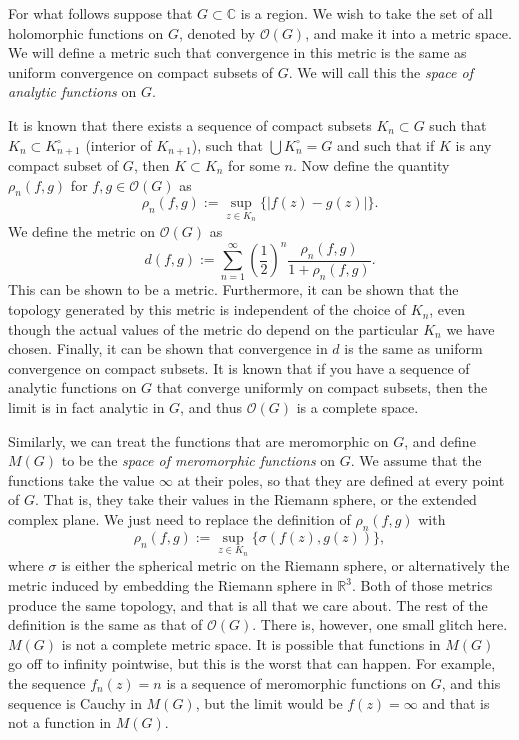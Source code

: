 \documentclass[12pt]{article}
\theoremstyle{theorem}
\theoremstyle{definition}
\theoremstyle{remark}
\begin{document}
For what follows suppose that $G \subset {\mathbb{C}}$ is a region.  We wish to take the set of all holomorphic functions on $G$, denoted by ${\mathcal{O}}(G)$, and make it into a metric space.  We will define a metric such that convergence in this metric is the same as uniform convergence on compact subsets of $G$.  We will call this the {\em space of analytic functions} on $G$.

It is known that there
exists a sequence of compact subsets $K_n \subset G$ such that $K_n \subset
K_{n+1}^\circ$ (interior of $K_{n+1}$), such that $\bigcup K_n^\circ = G$ and
such that if $K$ is any compact subset of $G$, then $K \subset K_n$ for some $n$.
Now define the quantity $\rho_n(f,g)$ for $f,g \in {\mathcal{O}}(G)$ as
\begin{equation*}
\rho_n(f,g) := \sup_{z \in K_n} \{ \lvert f(z) - g(z) \rvert \} .
\end{equation*}
We define the metric on ${\mathcal{O}}(G)$ as
\begin{equation*}
d(f,g) := \sum_{n=1}^\infty \left(\frac{1}{2}\right)^n
\frac{\rho_n(f,g)}{1+\rho_n(f,g)} .
\end{equation*}
This can be shown to be a metric.  Furthermore, it can be shown that the topology generated by this metric is independent of the choice of $K_n$, even though
the actual values of the metric do depend on the particular $K_n$ we have chosen.
Finally, it can be shown that convergence in $d$ is the same as uniform convergence on compact subsets.  It is known that if you have a sequence of
analytic functions on $G$ that converge uniformly on compact subsets, then the limit is in fact analytic in $G$, and thus ${\mathcal{O}}(G)$ is a complete space. 

Similarly, we can treat the functions that are meromorphic on $G$, and define
$M(G)$ to be the {\em space of meromorphic functions} on $G$.  We assume that the
functions take the value $\infty$ at their poles, so that they are defined at
every point of $G$.  That is, they take their values in the Riemann sphere, or the extended complex plane.  We just need to replace
the definition of $\rho_n(f,g)$ with
\begin{equation*}
\rho_n(f,g) := \sup_{z \in K_n} \{ \sigma (f(z), g(z)) \} ,
\end{equation*}
where $\sigma$ is either the spherical metric on the Riemann sphere, or alternatively the metric induced by embedding the Riemann sphere in ${\mathbb{R}}^3$.  Both of those metrics produce the same topology, and that is all that we care about.  The rest of the definition is the same as that of ${\mathcal{O}}(G)$.  There is, however, one small glitch here.  $M(G)$ is not a complete metric space.  It is possible that functions in $M(G)$ go off to infinity pointwise, but this is the worst that can happen.  For example, the sequence $f_n(z) = n$ is a sequence of meromorphic functions on $G$, and
this sequence is Cauchy in $M(G)$, but the limit would be $f(z) = \infty$ and
that is not a function in $M(G)$.
\end{document}
